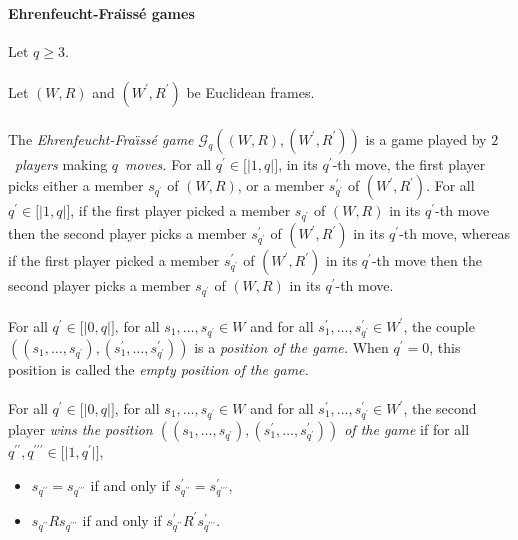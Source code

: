 \documentclass[draft]{article}
\def\lsem{{\lbrack\mid}}
\def\rsem{{\mid\rbrack}}
\begin{document}
\paragraph{Ehrenfeucht-Fra\"\i ss\'e games}
%
%
Let $q{\geq}3$.
%
%
\\
\\
%
%
Let $(W,R)$ and $(W^{\prime},R^{\prime})$ be Euclidean frames.
%
%
\\
\\
%
%
The {\it Ehrenfeucht-Fra\"\i ss\'e game ${\mathcal G}_{q}((W,R),(W^{\prime},R^{\prime}))$}\/ is a game played by $2$~{\it players}\/ making $q$~{\it moves.}
For all $q^{\prime}{\in}\lsem1,q\rsem$, in its $q^{\prime}$-th move, the first player picks either a member $s_{q^{\prime}}$ of $(W,R)$, or a member $s_{q^{\prime}}^{\prime}$ of $(W^{\prime},R^{\prime})$.
For all $q^{\prime}{\in}\lsem1,q\rsem$, if the first player picked a member $s_{q^{\prime}}$ of $(W,R)$ in its $q^{\prime}$-th move then the second player picks a member $s_{q^{\prime}}^{\prime}$ of $(W^{\prime},R^{\prime})$ in its $q^{\prime}$-th move, whereas if the first player picked a member $s_{q^{\prime}}^{\prime}$ of $(W^{\prime},R^{\prime})$ in its $q^{\prime}$-th move then the second player picks a member $s_{q^{\prime}}$ of $(W,R)$ in its $q^{\prime}$-th move.
%
%
\\
\\
%
%
For all $q^{\prime}{\in}\lsem0,q\rsem$, for all $s_{1},\ldots,s_{q^{\prime}}{\in}W$ and for all $s^{\prime}_{1},\ldots,s^{\prime}_{q^{\prime}}{\in}W^{\prime}$, the couple $((s_{1},\ldots,s_{q^{\prime}}),(s^{\prime}_{1},\ldots,s^{\prime}_{q^{\prime}}))$ is a {\it position of the game.}
When $q^{\prime}{=}0$, this position is called the {\it empty position of the game.}
%
%
\\
\\
%
%
For all $q^{\prime}{\in}\lsem0,q\rsem$, for all $s_{1},\ldots,s_{q^{\prime}}{\in}W$ and for all $s^{\prime}_{1},\ldots,s^{\prime}_{q^{\prime}}{\in}W^{\prime}$, the second player {\it wins the position $((s_{1},\ldots,s_{q^{\prime}}),(s^{\prime}_{1},\ldots,s^{\prime}_{q^{\prime}}))$ of the game}\/ if for all $q^{\prime\prime},q^{\prime\prime\prime}{\in}
%
%
%
%
%
%
%
%
%
%
%
%
$\linebreak$
%
%
%
%
%
%
%
%
%
%
%
%
\lsem1,q^{\prime}\rsem$,
%
%
\begin{itemize}
%
%
\item $s_{q^{\prime\prime}}{=}s_{q^{\prime\prime\prime}}$ if and only if $s^{\prime}_{q^{\prime\prime}}{=}s^{\prime}_{q^{\prime\prime\prime}}$,
%
%
\item $s_{q^{\prime\prime}}{R}s_{q^{\prime\prime\prime}}$ if and only if $s^{\prime}_{q^{\prime\prime}}{R^{\prime}}s^{\prime}_{q^{\prime\prime\prime}}$.
%
%
\end{itemize}
\end{document}
